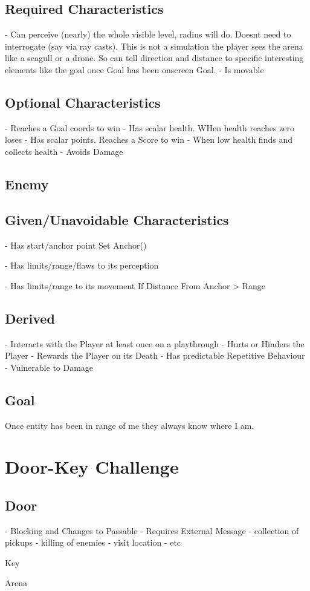\documentclass{article}
\begin{document}
\subsection{Required Characteristics}

- Can perceive (nearly) the whole visible level, radius will do. Doesnt need to interrogate (say via ray casts). This is not a simulation the player sees the arena like a seagull or a drone. So can tell direction and distance to specific interesting elements like the goal once Goal has been onscreen Goal.
- Is movable

\subsection{Optional Characteristics}

- Reaches a Goal coords to win
- Has scalar health. WHen health reaches zero loses
- Has scalar points. Reaches a Score to win
- When low health finds and collects health
- Avoids Damage

\subsection{Enemy}

\subsection{Given/Unavoidable Characteristics}

- Has start/anchor point
    Set Anchor()

- Has limits/range/flaws to its perception

- Has limits/range to its movement
    If Distance From Anchor > Range

\subsection{Derived}

- Interacts with the Player at least once on a playthrough
- Hurts or Hinders the Player
- Rewards the Player on its Death
- Has predictable Repetitive Behaviour
- Vulnerable to Damage

\subsection{Goal}

Once entity has been in range of me they always know where I am.

\section{Door-Key Challenge}

\subsection{Door}

- Blocking and Changes to Passable
- Requires External Message
    - collection of pickups
    - killing of enemies
    - visit location
    - etc

Key

Arena



\blindtext
\end{document}
